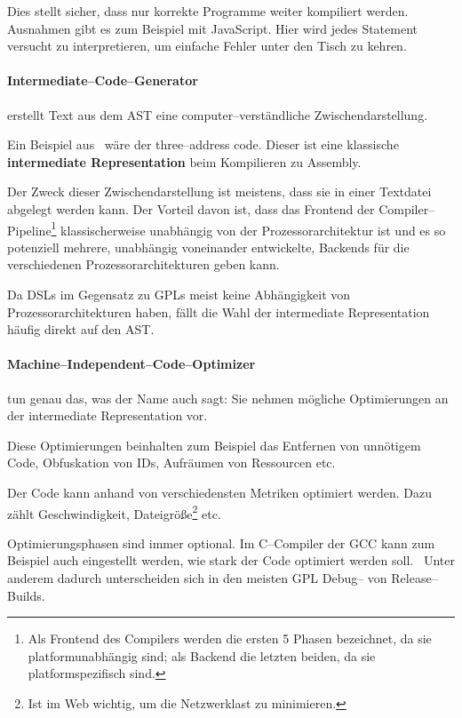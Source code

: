 Dies stellt sicher, dass nur korrekte Programme weiter kompiliert werden.
Ausnahmen gibt es zum Beispiel mit JavaScript.
Hier wird jedes Statement versucht zu interpretieren, um einfache Fehler unter den Tisch zu kehren.~\autocite{larsen-2016}

\paragraph{Intermediate--Code--Generator} erstellt Text aus dem \ac{AST} eine computer--verständliche Zwischendarstellung.

Ein Beispiel aus~\cite{aho-2006} wäre der three--address code.
Dieser ist eine klassische \textbf{intermediate Representation} beim Kompilieren zu Assembly.

Der Zweck dieser Zwischendarstellung ist meistens, dass sie in einer Textdatei abgelegt werden kann.
Der Vorteil davon ist, dass das Frontend der Compiler--Pipeline\footnote{Als Frontend des Compilers werden die ersten 5 Phasen bezeichnet, da sie platformunabhängig sind; als Backend die letzten beiden, da sie platformspezifisch sind.} klassischerweise unabhängig von der Prozessorarchitektur ist und es so potenziell mehrere, unabhängig voneinander entwickelte, Backends für die verschiedenen Prozessorarchitekturen geben kann.

Da \acp{DSL} im Gegensatz zu \acp{GPL} meist keine Abhängigkeit von Prozessorarchitekturen haben, fällt die Wahl der intermediate Representation häufig direkt auf den \ac{AST}.

\paragraph{Machine--Independent--Code--Optimizer}\label{par:machine-independent-code-optimizer} tun genau das, was der Name auch sagt: Sie nehmen mögliche Optimierungen an der intermediate Representation vor.

Diese Optimierungen beinhalten zum Beispiel das Entfernen von unnötigem Code, Obfuskation von \acp{ID}, Aufräumen von Ressourcen etc.

Der Code kann anhand von verschiedensten Metriken optimiert werden.
Dazu zählt Geschwindigkeit, Dateigröße\footnote{Ist im Web wichtig, um die Netzwerklast zu minimieren.} etc.~\autocite{aho-2006}

Optimierungsphasen sind immer optional.
Im C--Compiler der \ac{GCC} kann zum Beispiel auch eingestellt werden, wie stark der Code optimiert werden soll.~\autocite{gnu-project-no-date}
Unter anderem dadurch unterscheiden sich in den meisten \ac{GPL} Debug-- von Release--Builds.


